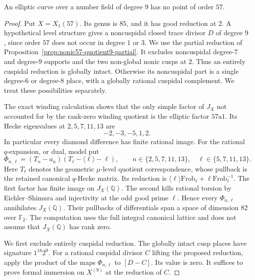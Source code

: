 \begin{proposition}\label{prop:nonic57-exclusion}
An elliptic curve over a number field of degree $9$ has no point
of order $57$.
\end{proposition}
\begin{proof}
Put $X=X_1(57)$. Its genus is $85$, and it has good reduction at
$2$. A hypothetical level structure gives a noncuspidal closed
trace divisor $D$ of degree $9$, since order $57$ does not occur
in degree $1$ or $3$.
We use the partial reduction of
Proposition~\ref{prop:nonic57-quotient9-partial}.
It excludes noncuspidal degree-$7$ and degree-$9$ supports and
the two non-global nonic cusps at $2$.
Thus an entirely cuspidal reduction is globally intact.
Otherwise its noncuspidal part is a single degree-$6$ or
degree-$8$ place, with a globally rational cuspidal complement.
We treat these possibilities separately.

The exact winding calculation shows that the only simple factor
of $J_X$ not accounted for by the rank-zero winding quotient is
the elliptic factor $57\mathrm a1$.
Its Hecke eigenvalues at $2,5,7,11,13$ are
\[
 -2,-3,-5,1,2.
\]
In particular every diamond difference has finite rational image.
For the rational $q$-expansion, or dual, model put
\[
 \Phi_{n,\ell}=(T_n-a_n)
       (T_\ell-\langle\ell\rangle-\ell),\qquad
 n\in\{2,5,7,11,13\},\quad \ell\in\{5,7,11,13\}.
\]
Here $T_\ell$ denotes the geometric $\mu$-level quotient
correspondence, whose pullback is the retained canonical
$q$-Hecke matrix. Its reduction is
$\langle\ell\rangle\mathrm{Frob}_\ell+
\ell\mathrm{Frob}_\ell^{-1}$.
The first factor has finite image on $J_X(\mathbb Q)$.
The second kills rational torsion by Eichler--Shimura and
injectivity at the odd good prime $\ell$.
Hence every $\Phi_{n,\ell}$ annihilates $J_X(\mathbb Q)$.
Their pullbacks of differentials span a space of dimension $82$
over $\mathbb F_2$. The computation uses the full integral
canonical lattice and does not assume that $J_X(\mathbb Q)$
has rank zero.

We first exclude entirely cuspidal reduction.
The globally intact cusp places have signature $1^{18}2^9$.
For a rational cuspidal divisor $C$ lifting the proposed
reduction, apply the product of the maps $\Phi_{n,\ell}$ to
$[D-C]$. Its value is zero.
It suffices to prove formal immersion on $X^{(9)}$ at the
reduction of $C$.


\end{proof}
